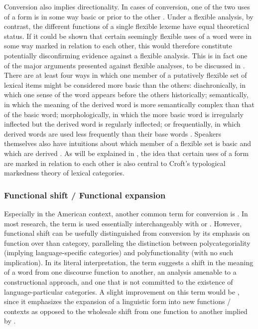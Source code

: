 Conversion also implies directionality. In cases of conversion, one of the two uses of a form is in some way basic or prior to the other \parencites[156]{Mithun2017}[5]{VapnarskyVeneziano2017a}. Under a flexible analysis, by contrast, the different functions of a single flexible lexeme have equal theoretical status. If it could be shown that certain seemingly flexible uses of a word were in some way marked in relation to each other, this would therefore constitute potentially disconfirming evidence against a flexible analysis. This is in fact one of the major arguments presented against flexible analyses, to be discussed in . There are at least four ways in which one member of a putatively flexible set of lexical items might be considered more basic than the others: diachronically, in which one sense of the word appears before the others historically; semantically, in which the meaning of the derived word is more semantically complex than that of the basic word; morphologically, in which the more basic word is irregularly inflected but the derived word is regularly inflected; or frequentially, in which derived words are used less frequently than their base words \parencite[108--111]{Plag2003}. Speakers themselves also have intuitions about which member of a flexible set is basic and which are derived \parencite[166]{Mithun2017}. As will be explained in , the idea that certain uses of a form are marked in relation to each other is also central to Croft's typological markedness theory of lexical categories.

\subsubsection{Functional shift / Functional expansion}
\label{sec:2.3.1.8}

Especially in the American context, another common term for conversion is  \parencite{Cannon1985}. In most research, the term is used essentially interchangeably with  or . However, functional shift can be usefully distinguished from conversion by its emphasis on function over than category, paralleling the distinction between polycategoriality (implying language-specific categories) and polyfunctionality (with no such implication). In its literal interpretation, the term suggests a shift in the meaning of a word from one discourse function to another, an analysis amenable to a constructional approach, and one that is not committed to the existence of language-particular categories. A slight improvement on this term would be , since it emphasizes the expansion of a linguistic form into new functions / contexts as opposed to the wholesale shift from one function to another implied by .

